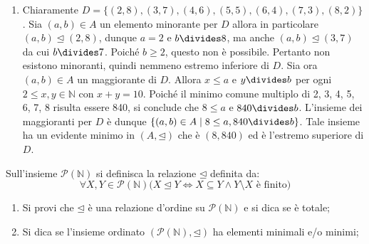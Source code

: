 \begin{enumerate}
	\item Chiaramente $D=\{(2,8),(3,7),(4,6),(5,5),(6,4),(7,3),(8,2)\}$. Sia $(a,b) \in A$ un elemento minorante per $D$ allora in particolare $(a,b) \unlhd (2,8)$, dunque $a=2$ e $b \divides 8$, ma anche $(a,b) \unlhd (3,7)$ da cui $b \divides 7$. Poiché $b \geq 2$, questo non è possibile. Pertanto non esistono minoranti, quindi nemmeno estremo inferiore di $D$. Sia ora $(a,b) \in A$ un maggiorante di $D$. Allora $x \leq a $ e $y \divides b$ per ogni $2 \leq x,y \in \mathbb{N}$ con $x+y=10$. Poiché il minimo comune multiplo di 2, 3, 4, 5, 6, 7, 8 risulta essere 840, si conclude che $8 \leq a$ e $840 \divides b$. L'insieme dei maggioranti per $D$ è dunque $\{(a,b) \in A \; | \; 8 \leq a, 840 \divides b\}$. Tale insieme ha un evidente minimo in $(A,\unlhd)$ che è $(8,840)$ ed è l'estremo superiore di $D$. \hfill \blacksquare
\end{enumerate}
\begin{exsbox}
	Sull'insieme $\mathcal{P}(\mathbb{N})$ si definisca la relazione $\unlhd$ definita da:
	\begin{displaymath}
		\forall X,Y \in \mathcal{P}(\mathbb{N}) \bigl(X \unlhd Y \iff X \subseteq Y \land Y \setminus X \text{ è finito}\bigr)
	\end{displaymath}
	\begin{enumerate}
		\item Si provi che $\unlhd$ è una relazione d'ordine su $\mathcal{P}(\mathbb{N})$ e si dica se è totale;
		\item Si dica se l'insieme ordinato $(\mathcal{P}(\mathbb{N}),\unlhd)$ ha elementi minimali e/o minimi;
	\end{enumerate}
\end{exsbox}
